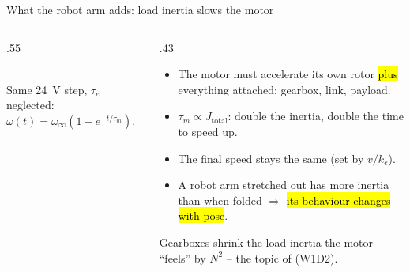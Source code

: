 \documentclass[aspectratio=169,10pt]{beamer}
\begin{document}
\begin{frame}{What the robot arm adds: load inertia slows the motor}
\begin{columns}[T]
\begin{column}{.55\textwidth}
\\
{\scriptsize\color{mkGray} Same \SI{24}{\volt} step, $\tau_e$ neglected: $\omega(t)=\omega_\infty(1-e^{-t/\tau_m})$.}
\end{column}
\begin{column}{.43\textwidth}
\small
\begin{itemize}\setlength\itemsep{2pt}
\item The motor must accelerate its own rotor \hl{plus} everything attached: gearbox, link, payload.
\item $\tau_m\propto J_\text{total}$: double the inertia, double the time to speed up.
\item The final speed stays the same (set by $v/k_e$).
\item A robot arm stretched out has more inertia than when folded $\Rightarrow$ \hl{its behaviour changes with pose}.
\end{itemize}
\begin{notebox}
\small
Gearboxes shrink the load inertia the motor ``feels'' by $N^2$ -- the topic of  (W1D2).
\end{notebox}
\end{column}
\end{columns}
\end{frame}
\end{document}
